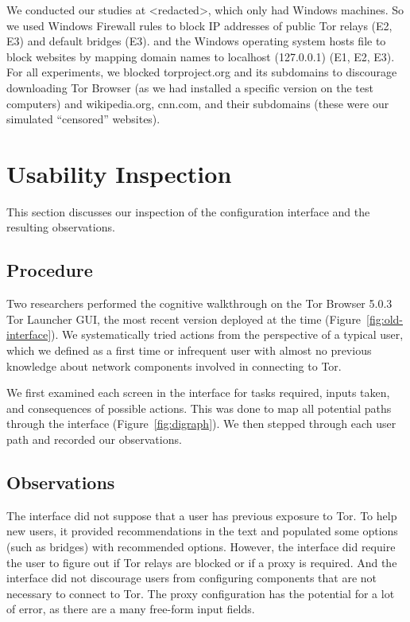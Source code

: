 \documentclass[USenglish,oneside,twocolumn]{article}
\begin{document}
We conducted our studies at <redacted>, which only had Windows machines. 
So we used Windows Firewall rules to block IP addresses of public Tor relays (E2, E3) and default bridges (E3). 
and the Windows operating system hosts file to block websites by
mapping domain names to localhost (127.0.0.1) (E1, E2, E3). For all experiments, we blocked torproject.org and its subdomains to discourage downloading Tor Browser (as we had installed a specific version on the test computers) and wikipedia.org, cnn.com, and their subdomains (these were our simulated ``censored'' websites). 

\section{Usability Inspection}
\label{sec:inspection}
This section discusses our inspection of the configuration interface and the resulting observations.

\subsection{Procedure} 
Two researchers performed the cognitive walkthrough on the Tor Browser 5.0.3 Tor Launcher GUI, the most recent version deployed at the time (Figure~\ref{fig:old-interface}). We systematically tried actions from the perspective of a typical user, which we defined as a first time or infrequent user with almost no previous knowledge about network components involved in connecting to Tor.

We first examined each screen in the interface for tasks required, inputs taken, and consequences of possible actions. This was done to map all potential paths through the interface (Figure~\ref{fig:digraph}). We then stepped through each user path and recorded our observations. 

\subsection{Observations}
The interface did not suppose that a user has previous exposure to Tor. To help new users, it provided recommendations in the text and populated some options (such as bridges) with recommended options. However, the interface did require the user to figure out if Tor relays are blocked or if a proxy is required. And the interface did not discourage users from configuring components that are not necessary to connect to Tor. The proxy configuration has the potential for a lot of error, as there are a many free-form input fields. 
\end{document}
